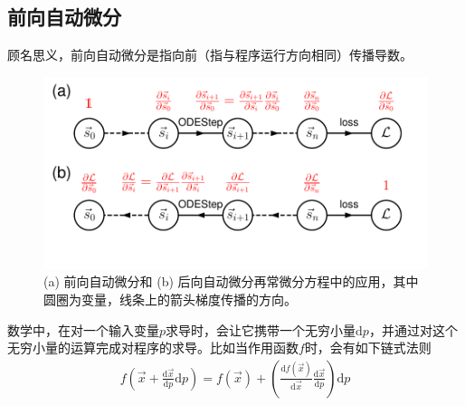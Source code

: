 \documentclass[A4,twoside,fontset=ubuntu,UTF8]{ctexart}
\def\D{\mathrm{d}}
\begin{document}
\subsection{前向自动微分}
    顾名思义，前向自动微分是指向前（指与程序运行方向相同）传播导数。
    \begin{figure}[t]
        \centering
        \includegraphics[width=0.7\columnwidth,trim={0 0cm 0 0},clip]{fig3.pdf}

        \caption{(a) 前向自动微分和 (b) 后向自动微分再常微分方程中的应用，其中圆圈为变量，线条上的箭头梯度传播的方向。}\label{fig:autodifftypes} 
\end{figure}
数学中，在对一个输入变量$p$求导时，会让它携带一个无穷小量$\D p$，并通过对这个无穷小量的运算完成对程序的求导。比如当作用函数$f$时，会有如下链式法则
\begin{align}
    f(\vec x+ \frac{\D \vec x}{\D p} \D p) = f(\vec x) + \left(\frac{\D f(\vec x)}{\D \vec x}\frac{\D \vec x}{\D p}\right) \D p
\end{align}
\end{document}
